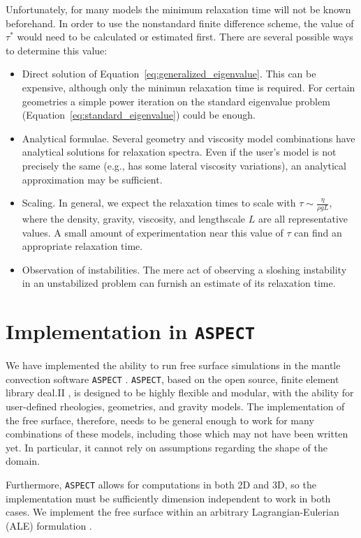 \documentclass[preprint,12pt,authoryear]{elsarticle}
\begin{document}
Unfortunately, for many models the minimum relaxation time will not be known beforehand. 
In order to use the nonstandard finite difference scheme, the value of $\tau^*$ would need 
to be calculated or estimated first.  There are several possible ways to determine this value:

\begin{itemize}
\item Direct solution of Equation~\eqref{eq:generalized_eigenvalue}. This can be expensive, although
only the minimun relaxation time is required. For certain geometries a simple power iteration on 
the standard eigenvalue problem (Equation~\eqref{eq:standard_eigenvalue}) could be enough.
\item Analytical formulae. Several geometry and viscosity model combinations have analytical solutions
for relaxation spectra. Even if the user's model is not precisely the same (e.g., has some lateral viscosity
variations), an analytical approximation may be sufficient.
\item Scaling. In general, we expect the relaxation times to scale with $\tau \sim \frac{\eta}{\rho g L}$,
where the density, gravity, viscosity, and lengthscale $L$ are all representative values.  A small amount
of experimentation near this value of $\tau$ can find an appropriate relaxation time.
\item Observation of instabilities.  The mere act of observing a sloshing instability in an unstabilized
problem can furnish an estimate of its relaxation time.
\end{itemize} 


\section{Implementation in \texttt{ASPECT} }
\label{sec:implementation}
We have implemented the ability to run free surface simulations in the mantle convection software \texttt{ASPECT} \citep{aspectweb,kronbichler2012high}. 
\texttt{ASPECT}, based on the open source, finite element library deal.II \citep{dealII82}, is designed to be highly flexible and modular, with the ability for user-defined rheologies, geometries, and gravity models. 
The implementation of the free surface, therefore, needs to be general enough to work for many combinations of these models, including those 
which may not have been written yet. In particular, it cannot rely on assumptions regarding the shape of the domain.

Furthermore, \texttt{ASPECT} allows for computations in both 2D and 3D, so the implementation must be sufficiently dimension
independent to work in both cases. We implement the free surface within an arbitrary Lagrangian-Eulerian (ALE) formulation
\citep[e.g][]{fullsack1995arbitrary,donea2004encyclopedia}.
\end{document}
